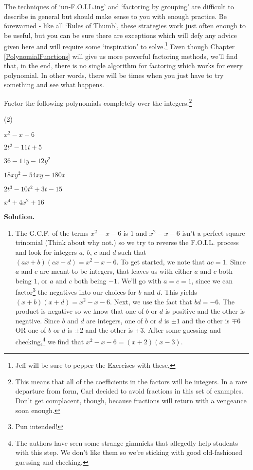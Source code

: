 The techniques of `un-F.O.I.L.ing' and `factoring by grouping' are difficult to describe in general but should make sense to you with enough practice.  Be forewarned - like all `Rules of Thumb', these strategies work just often enough to be useful, but you can be sure there are exceptions which will defy any advice given here and will require some `inspiration' to solve.\footnote{Jeff will be sure to pepper the Exercises with these.} Even though Chapter \ref{PolynomialFunctions} will give us more powerful factoring methods, we'll find that, in the end, there is no single algorithm for factoring which works for every polynomial. In other words, there will be times when you just have to try something and see what happens.

\begin{ex}\label{advfactoring}  Factor the following polynomials completely over the integers.\footnote{This means that all of the coefficients in the factors will be integers. In a rare departure from form, Carl decided to avoid fractions in this set of examples.  Don't get complacent, though, because fractions will return with a vengeance soon enough.}

\begin{tasks}(2)

\task  $x^2 - x - 6$  

\task  $2t^2 - 11t + 5$

\task  $36 - 11y - 12y^2$

\task  $18xy^2 - 54xy - 180x$

\task  $2t^3 - 10t^2 + 3t - 15$ 

\task  $x^4 + 4x^2 + 16$

\end{tasks}

{\bf Solution.}

\begin{enumerate}

\item  The G.C.F. of the terms $x^2 - x - 6$  is $1$ and $x^2 - x - 6$ isn't a perfect square trinomial (Think about why not.) so we try to reverse the F.O.I.L. process and look for integers $a$, $b$, $c$ and $d$ such that $(ax + b)(cx + d) = x^2 - x - 6$.  To get started, we note that $ac = 1$.  Since $a$ and $c$ are meant to be integers, that leaves us with either $a$ and $c$ both being $1$, or $a$ and $c$ both being $-1$.  We'll go with $a = c = 1$, since we can factor\footnote{Pun intended!} the negatives into our choices for $b$ and $d$.  This yields $(x+b)(x+d) = x^2-x-6$.  Next, we use the fact that $bd = -6$.  The product is negative so we know that one of $b$ or $d$ is positive and the other is negative.  Since $b$ and $d$ are integers, one of $b$ or $d$ is $\pm 1$ and the other is $\mp 6$ OR one of $b$ or $d$ is $\pm 2$ and the other is $\mp 3$. After some guessing and checking,\footnote{The authors have seen some strange gimmicks that allegedly help students with this step.  We don't like them so we're sticking with good old-fashioned guessing and checking.} we find that $x^2 - x - 6 = (x+2)(x-3)$.


\end{enumerate}
\end{ex}

